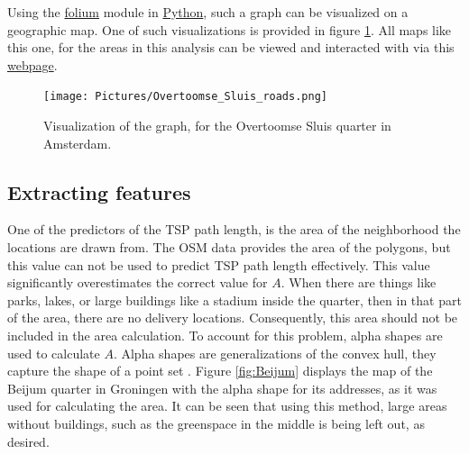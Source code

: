 Using the \url{folium} module in \url{Python}, such a graph can be visualized on a geographic map.
One of such visualizations is provided in figure \ref{fig:overtoomse_sluis}. All maps like this one,
for the areas in this analysis can be viewed and interacted with via this
\href{https://koenstevens.nl/projects/BSc_thesis/maps/}{\url{webpage}}.
\begin{figure}[H]
	\caption{Visualization of the graph, for the Overtoomse Sluis quarter in Amsterdam.}
	\label{fig:overtoomse_sluis}
	\texttt{[image: Pictures/Overtoomse\_Sluis\_roads.png]}
\end{figure}

\subsection{Extracting features}
One of the predictors of the TSP path length, is the area of the neighborhood the locations are drawn from.
The OSM data provides the area of the polygons, but this value can not be used to predict TSP path length effectively.
This value significantly overestimates the correct value for $A$.
When there are things like parks, lakes, or large buildings like a stadium inside the quarter, then in that part of the
area, there are no delivery locations. Consequently, this area should not be included in the area calculation.
To account for this problem, alpha shapes are used to calculate $A$. Alpha shapes are generalizations of the convex hull,
they capture the shape of a point set \citep{akkiraju1995alpha}. Figure \ref{fig:Beijum} displays the map of the Beijum
quarter in Groningen with the alpha shape for its addresses, as it was used for calculating the area.
It can be seen that using this method, large areas without buildings, such as the greenspace in the middle is being left
out, as desired.
